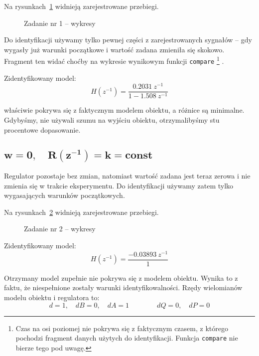 \documentclass[11pt, a4paper]{article}
\begin{document}
Na rysunkach~\ref{fig:zd1} widnieją zarejestrowane przebiegi.
\begin{figure}[htbp!]
	\centering
	\hfill%
	\caption{Zadanie nr 1 -- wykresy}
	\label{fig:zd1}
\end{figure}

Do identyfikacji używamy tylko pewnej części z zarejestrowanych sygnałów -- gdy wygasły już warunki początkowe i wartość zadana zmieniła się skokowo. Fragment ten widać choćby na wykresie wynikowym funkcji \texttt{compare}%
\footnote{Czas na osi poziomej nie pokrywa się z faktycznym czasem, z którego pochodzi fragment danych użytych do identyfikacji. Funkcja \texttt{compare} nie bierze tego pod uwagę.}%
.

Zidentyfikowany model:
\[
	H(z^{-1}) = \frac{0.2031 \ z^{-1}}{1 - 1.508 \ z^{-1}}
\]

właściwie pokrywa się z faktycznym modelem obiektu, a różnice są minimalne. Gdybyśmy, nie używali szumu na wyjściu obiektu, otrzymalibyśmy stu procentowe dopasowanie.

\subsection{$\displaystyle \mathbf{w = 0, \quad R(z^{-1}) = k = const}$}

Regulator pozostaje bez zmian, natomiast wartość zadana jest teraz zerowa i nie zmienia się w trakcie eksperymentu. Do identyfikacji używamy zatem tylko wygasających warunków początkowych.

Na rysunkach~\ref{fig:zd2} widnieją zarejestrowane przebiegi.
\begin{figure}[htbp!]
	\centering
	\hfill%
	\caption{Zadanie nr 2 -- wykresy}
	\label{fig:zd2}
\end{figure}

Zidentyfikowany model:
\[
	H(z^{-1}) = \frac{-0.03893 \ z^{-1}}{1}
\]

Otrzymany model zupełnie nie pokrywa się z modelem obiektu. Wynika to z faktu, że niespełnione zostały warunki identyfikowalności. Rzędy wielomianów modelu obiektu i regulatora to:
\[
	d = 1, \quad dB = 0, \quad dA = 1 \qquad\qquad
	dQ = 0, \quad dP = 0
\]
\end{document}
